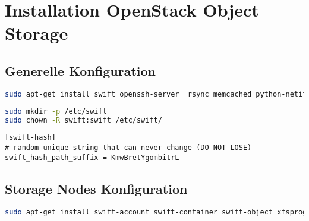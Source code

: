 \cleardoublepage
\chapter{Installation OpenStack Object Storage}
\section{Generelle Konfiguration}

\begin{lstlisting}[label=paketegenerell, language=Bash, caption=Installation generelle Host Pakete ]
sudo apt-get install swift openssh-server  rsync memcached python-netifaces python-xattr python-memcache 
\end{lstlisting}

\begin{lstlisting}[label=swiftconfdir, language=Bash, caption=Erstell /etc/swift Ordner und setzt Berechtigung ]
sudo mkdir -p /etc/swift
sudo chown -R swift:swift /etc/swift/
\end{lstlisting}


\begin{lstlisting}[label=swift.conf language=Bash, caption=Swift in /etc/swift/swift.conf konfigurieren]
[swift-hash]
# random unique string that can never change (DO NOT LOSE)
swift_hash_path_suffix = KmwBretYgombitrL
\end{lstlisting}

\section{Storage Nodes Konfiguration}

\begin{lstlisting}[label=paketenode, language=Bash, caption=Installation Data-Node Pakete ]
sudo apt-get install swift-account swift-container swift-object xfsprogs
\end{lstlisting}


